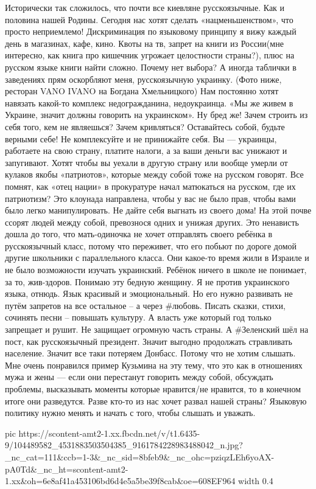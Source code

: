 Исторически так сложилось, что почти все киевляне русскоязычные. Как и половина нашей Родины. Сегодня нас хотят сделать «нацменьшенством», что просто неприемлемо!
Дискриминация по языковому принципу я вижу каждый день в магазинах, кафе, кино. Квоты на тв, запрет на книги из России(мне интересно, как книга про кишечник угрожает целостности страны?), плюс на русском языке книги найти сложно.
Почему нет выбора?
А иногда таблички в заведениях прям оскорбляют меня, русскоязычную украинку. (Фото ниже, ресторан VANO IVANO
 на Богдана Хмельницкого)
Нам постоянно хотят навязать какой-то комплекс недогражданина, недоукраинца. «Мы же живем в Украине, значит должны говорить на украинском». Ну бред же!
Зачем строить из себя того, кем не являешься? Зачем кривляться? Оставайтесь собой, будьте верными себе! Не комплексуйте и не принижайте себя. Вы — украинцы, работаете на свою страну, платите налоги, а за ваши деньги вас унижают и запугивают. Хотят чтобы вы уехали в другую страну или вообще умерли от кулаков якобы «патриотов», которые между собой тоже на русском говорят. Все помнят, как «отец нации» в прокуратуре начал матюкаться на русском, где их патриотизм?
Это клоунада направлена, чтобы у вас не было прав, чтобы вами было легко манипулировать. Не дайте себя выгнать из своего дома!
На этой почве ссорят людей между собой, превознося одних и унижая других. Это ненависть дошла до того, что мать-одиночка не хочет отправлять своего ребёнка в русскоязычный класс, потому что переживет, что его побьют по дороге домой другие школьники с параллельного класса. Они какое-то время жили в Израиле и не было возможности изучать украинский. Ребёнок ничего в школе не понимает, за то, жив-здоров. Понимаю эту бедную женщину.
Я не против украинского языка, отнюдь. Язык красивый и эмоциональный. Но его нужно развивать не путём запретов на все остальное – а через #любовь. Писать сказки, стихи, сочинять песни – повышать культуру. А власть уже который год только запрещает и рушит. Не защищает огромную часть страны. А #Зеленский шёл на пост, как русскоязычный президент.
Значит выгодно продолжать стравливать население. Значит все таки потеряем Донбасс. Потому что не хотим слышать. Мне очень понравился пример Кузьмина на эту тему, что это как в отношениях мужа и жены — если они перестанут говорить между собой, обсуждать проблемы, высказывать моменты которые нравится/не нравится, то в конечном итоге они разведутся. Разве кто-то из нас хочет развал нашей страны?
Языковую политику нужно менять и начать с того, чтобы слышать и уважать.


\ifcmt
  pic https://scontent-amt2-1.xx.fbcdn.net/v/t1.6435-9/104489582_4531883503504385_9161784228983488042_n.jpg?_nc_cat=111&ccb=1-3&_nc_sid=8bfeb9&_nc_ohc=pziqzLEh6yoAX-pA0Td&_nc_ht=scontent-amt2-1.xx&oh=6e8af41a453106bd6d4e5a5be39f8cab&oe=608EF964
  width 0.4
\fi

